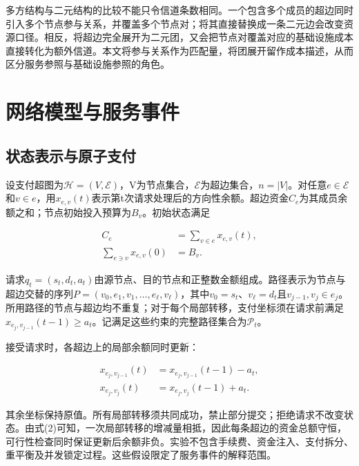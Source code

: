 \documentclass[UTF8,a4paper,twocolumn,fontset=none,zihao=5]{ctexart}
\begin{document}
多方结构与二元结构的比较不能只令信道条数相同。一个包含多个成员的超边同时引入多个节点参与关系，并覆盖多个节点对；将其直接替换成一条二元边会改变资源口径。相反，将超边完全展开为二元团，又会把节点对覆盖对应的基础设施成本直接转化为额外信道。本文将参与关系作为匹配量，将团展开留作成本描述，从而区分服务参照与基础设施参照的角色。


\section{网络模型与服务事件}

\subsection{状态表示与原子支付}

设支付超图为$\mathcal H=(V,\mathcal E)$，V为节点集合，$\mathcal E$为超边集合，$n=|V|$。对任意$e\in\mathcal E$和$v\in e$，用$x_{e,v}(t)$表示第t次请求处理后的方向性余额。超边资金$C_e$为其成员余额之和；节点初始投入预算为$B_v$。初始状态满足



\begin{equation}
\begin{aligned} C_e&=\sum_{v\in e}x_{e,v}(t),\\ \sum_{e\ni v}x_{e,v}(0)&=B_v.\end{aligned}
\label{eq:1}\end{equation}


请求$q_t=(s_t,d_t,a_t)$由源节点、目的节点和正整数金额组成。路径表示为节点与超边交替的序列$P=(v_0,e_1,v_1,\ldots,e_\ell,v_\ell)$，其中$v_0=s_t$、$v_\ell=d_t$且$v_{j-1},v_j\in e_j$。所用路径的节点与超边均不重复；对于每个局部转移，支付坐标须在请求前满足$x_{e_j,v_{j-1}}(t-1)\geq a_t$。记满足这些约束的完整路径集合为$\mathcal P_t$。


接受请求时，各超边上的局部余额同时更新：



\begin{equation}
\begin{aligned}x_{e_j,v_{j-1}}(t)&=x_{e_j,v_{j-1}}(t-1)-a_t,\\x_{e_j,v_j}(t)&=x_{e_j,v_j}(t-1)+a_t.\end{aligned}
\label{eq:2}\end{equation}


其余坐标保持原值。所有局部转移须共同成功，禁止部分提交；拒绝请求不改变状态。由式(2)可知，一次局部转移的增减量相抵，因此每条超边的资金总额守恒，可行性检查同时保证更新后余额非负。实验不包含手续费、资金注入、支付拆分、重平衡及并发锁定过程。这些假设限定了服务事件的解释范围。
\end{document}
